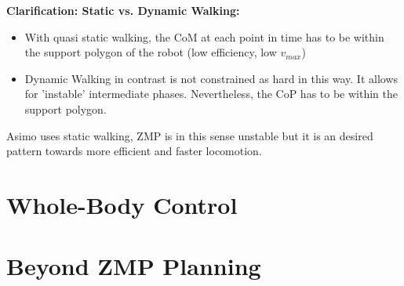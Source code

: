 \textbf{Clarification: Static vs. Dynamic Walking:}
\begin{itemize}
\item With quasi static walking, the CoM at each point in time has to be within the support polygon of the robot (low efficiency, low $v_{max}$)
\item Dynamic Walking in contrast is not constrained as hard in this way. It allows for 'instable' intermediate phases. Nevertheless, the CoP has to be within the support polygon.  
\end{itemize}
Asimo uses static walking, ZMP is in this sense unstable but it is an desired pattern towards more efficient and faster locomotion. 


\section{Whole-Body Control}


\section{Beyond ZMP Planning}






